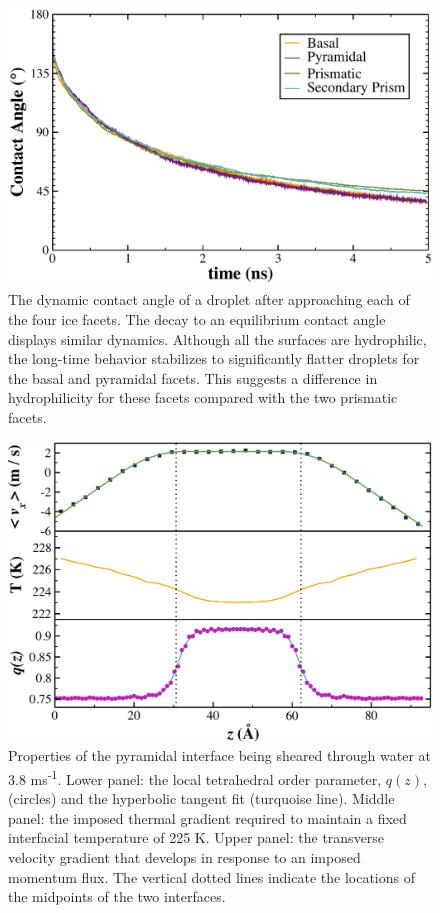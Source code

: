 \begin{figure}
\includegraphics[width=\linewidth]{Figures/ContactAngle}
\caption{\label{fig:ContactAngle} The dynamic contact angle of a
  droplet after approaching each of the four ice facets.  The decay to
  an equilibrium contact angle displays similar dynamics.  Although
  all the surfaces are hydrophilic, the long-time behavior stabilizes
  to significantly flatter droplets for the basal and pyramidal
  facets.  This suggests a difference in hydrophilicity for these
  facets compared with the two prismatic facets.}
\end{figure}



\begin{figure}
\includegraphics[width=\linewidth]{Figures/Pyr_comic_strip}
\caption{\label{fig:pyrComic} Properties of the pyramidal interface
  being sheared through water at 3.8 ms\textsuperscript{-1}. Lower
  panel: the local tetrahedral order parameter, $q(z)$, (circles) and
  the hyperbolic tangent fit (turquoise line).  Middle panel: the
  imposed thermal gradient required to maintain a fixed interfacial
  temperature of 225 K. Upper panel: the transverse velocity gradient
  that develops in response to an imposed momentum flux. The vertical
  dotted lines indicate the locations of the midpoints of the two
  interfaces.}
\end{figure}

